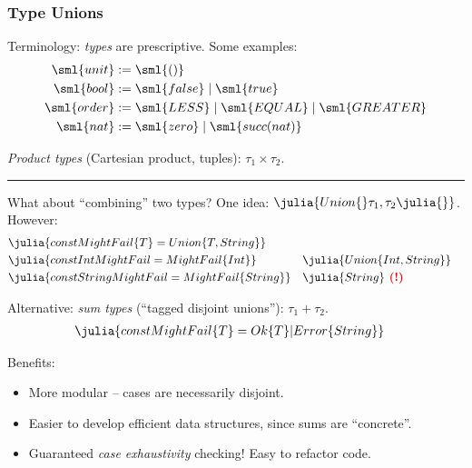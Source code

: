 \documentclass[8pt]{beamer}
\newcommand{\yikes}{\color{red}\textbf{ (!)}}
\begin{document}
\begin{frame}[fragile]
  \frametitle{Type Unions}

  Terminology: \emph{types} are prescriptive. Some examples:
  \begin{align*}
    \sml{unit}  &:= \sml{()} \\
    \sml{bool}  &:= \sml{false} \mid \sml{true} \\
    \sml{order} &:= \sml{LESS} \mid \sml{EQUAL} \mid \sml{GREATER} \\
    \sml{nat}   &:= \sml{zero} \mid \sml{succ(nat)}
  \end{align*}

  \textit{Product types} (Cartesian product, tuples): $\tau_1 \times \tau_2$.

  \noindent\rule{\linewidth}{0.4pt}

  What about ``combining'' two types? One idea: $\julia{Union\{}\tau_1,\tau_2\julia{\}}$. However:
  \begin{align*}
    &\julia{const MightFail\{T\} = Union\{T,String\}} \\
    &\julia{const IntMightFail = MightFail\{Int\}} &&\julia{Union\{Int,String\}} \\
    &\julia{const StringMightFail = MightFail\{String\}} &&\julia{String} \yikes
  \end{align*}

  Alternative: \textit{sum types} (``tagged disjoint unions''): $\tau_1 + \tau_2$.
  \begin{align*}
    &\julia{const MightFail\{T\} = Ok\{T\} | Error\{String\}}
  \end{align*}

  Benefits:
  \begin{itemize}
    \item More modular -- cases are necessarily disjoint.
    \item Easier to develop efficient data structures, since sums are ``concrete''.
    \item Guaranteed \emph{case exhaustivity} checking! Easy to refactor code.
  \end{itemize}
\end{frame}
\end{document}
